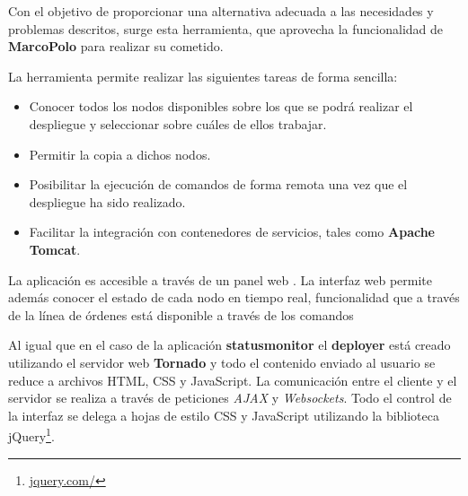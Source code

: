 Con el objetivo de proporcionar una alternativa adecuada a las necesidades y problemas descritos, surge esta herramienta, que aprovecha la funcionalidad de \textbf{MarcoPolo} para realizar su cometido.

La herramienta permite realizar las siguientes tareas de forma sencilla:

\begin{itemize}
\item Conocer todos los nodos disponibles sobre los que se podrá realizar el despliegue y seleccionar sobre cuáles de ellos trabajar.
\item Permitir la copia a dichos nodos.
\item Posibilitar la ejecución de comandos de forma remota una vez que el despliegue ha sido realizado.
\item Facilitar la integración con contenedores de servicios, tales como \textbf{Apache Tomcat}.
\end{itemize}

La aplicación es accesible a través de un panel web %
. La interfaz web permite además conocer el estado de cada nodo en tiempo real, funcionalidad que a través de la línea de órdenes está disponible a través de los comandos %

Al igual que en el caso de la aplicación \textbf{statusmonitor} el \textbf{deployer} está creado utilizando el servidor web \textbf{Tornado} y todo el contenido enviado al usuario se reduce a archivos HTML, CSS y JavaScript. La comunicación entre el cliente y el servidor se realiza a través de peticiones \textit{AJAX} y \textit{Websockets}. Todo el control de la interfaz se delega a hojas de estilo CSS y JavaScript utilizando la biblioteca jQuery\footnote{\href{https://jquery.com/}{jquery.com/}}.





